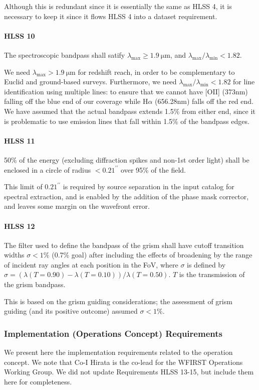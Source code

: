  Although this is redundant since it is essentially the same as HLSS 4, it is
 necessary to keep it since it flows HLSS 4 into a dataset requirement.

\paragraph{HLSS 10} The spectroscopic bandpass shall satify $\lambda_\mathrm{max} \geq 1.9\ \mathrm{\mu m}$, and $\lambda_\mathrm{max}/\lambda_\mathrm{min} < 1.82$.

 We need $\lambda_\mathrm{max} > 1.9\ \mathrm{ \mu m}$ for redshift reach, in order to be complementary to Euclid and ground-based surveys.  Furthermore, we need $\lambda_\mathrm{max}/\lambda_\mathrm{min} < 1.82$ for line identification using multiple lines: to ensure that we cannot have [OII] (373nm) falling off the blue end of our coverage while H$\alpha$ (656.28nm) falls off the red end. We have
 assumed that the actual bandpass extends 1.5\% from either end, since it is
 problematic to use emission lines that fall within 1.5\% of the bandpass edges.

\paragraph{HLSS 11} 50\% of the energy (excluding diffraction spikes and non-1st order light) shall be enclosed in a circle of radius $<0.21^{\prime\prime}$ over 95\% of the field.

 This limit of $0.21^{\prime\prime}$ is required by source separation in the input
 catalog for spectral extraction, and is enabled by the addition of the phase
 mask corrector, and leaves some margin on the wavefront error.

\paragraph{HLSS 12} The filter used to define the bandpass of the grism shall have cutoff transition widths $\sigma < 1\%$ (0.7\% goal) after including the effects of broadening
 by the range of incident ray angles at each position in the FoV, where $\sigma$ is
 defined by $\sigma= (\lambda(T=0.90)- \lambda(T=0.10))/\lambda(T=0.50)$. $T$ is the transmission of the
 grism bandpass.

 This is based on the grism guiding considerations; the assessment of grism
 guiding (and its positive outcome) assumed $\sigma < 1\%$.

 \subsubsection{Implementation (Operations Concept) Requirements} We present here the implementation requirements related to the operation concept. We note that Co-I Hirata is the co-lead for the WFIRST Operations Working Group. We did not update Requirements HLSS 13-15, but include them here for completeness.

